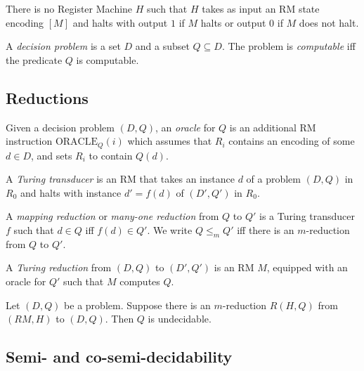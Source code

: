 \documentclass{article}
\begin{document}
\begin{theorem}[Notes I.8]
    There is no Register Machine $H$ such that $H$ takes as input an RM state encoding
    $[M]$ and halts with output $1$ if $M$ halts or output $0$ if $M$ does not halt. 
\end{theorem}


\begin{definition}
    A \emph{decision problem} is a set $D$ and a subset $Q\subseteq D$.
    The problem is \emph{computable} iff the predicate $Q$ is computable. 
\end{definition}

\subsection{Reductions}

\begin{definition}
    Given a decision problem $(D,Q)$, an \emph{oracle} for $Q$ is an additional 
    RM instruction $\text{ORACLE}_Q(i)$ which assumes that $R_i$ contains an
    encoding of some $d\in D$, and sets $R_i$ to contain $Q(d)$.
\end{definition}

\begin{definition}
    A \emph{Turing transducer} is an RM that takes an instance $d$ of a problem $(D,Q)$
    in $R_0$ and halts with instance $d'=f(d)$ of $(D',Q')$ in $R_0$.
\end{definition}

\begin{definition}
    A \emph{mapping reduction} or \emph{many-one reduction} from $Q$ to $Q'$ is a
    Turing transducer $f$ such that $d\in Q$ iff $f(d)\in Q'$. We write $Q\leq_m Q'$
    iff there is an $m$-reduction from $Q$ to $Q'$.
\end{definition}

\begin{definition}
    A \emph{Turing reduction} from $(D,Q)$ to $(D',Q')$ is an RM $M$, equipped with
    an oracle for $Q'$ such that $M$ computes $Q$.
\end{definition}

\begin{theorem}[Notes I.15]
    Let $(D,Q)$ be a problem. Suppose there is an $m$-reduction $R(H,Q)$ from 
    $(RM, H)$ to $(D,Q)$. Then $Q$ is undecidable. 
\end{theorem}

\subsection{Semi- and co-semi-decidability}
\end{document}
